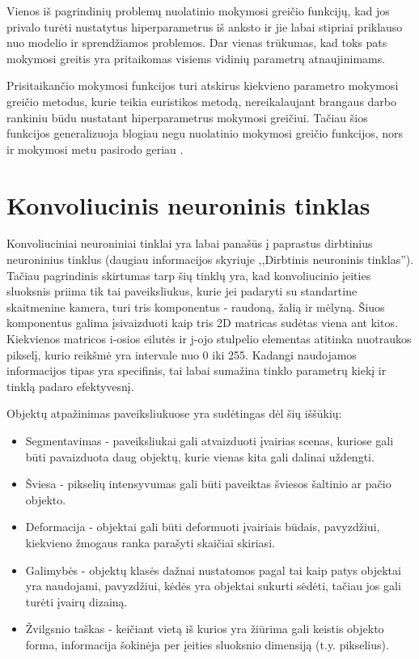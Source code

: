 \documentclass{VUMIFPSkursinis}
\begin{document}
Vienos iš pagrindinių problemų nuolatinio mokymosi greičio funkcijų, kad jos privalo turėti nustatytus hiperparametrus 
iš anksto ir jie labai stipriai priklauso nuo modelio ir sprendžiamos problemos. Dar vienas trūkumas, kad toks pats 
mokymosi greitis yra pritaikomas visiems vidinių parametrų atnaujinimams.

Prisitaikančio mokymosi funkcijos turi atskirus kiekvieno parametro mokymosi greičio metodus, kurie teikia euristikos 
metodą, nereikalaujant brangaus darbo rankiniu būdu nustatant hiperparametrus mokymosi greičiui. Tačiau šios funkcijos 
generalizuoja blogiau negu nuolatinio mokymosi greičio funkcijos, nors ir mokymosi metu pasirodo geriau \cite{2017arXiv170508292W}.


\section{Konvoliucinis neuroninis tinklas}
Konvoliuciniai neuroniniai tinklai yra labai panašūs į paprastus dirbtinius neuroninius tinklus (daugiau informacijos skyriuje ,,Dirbtinis neuroninis
tinklas''). Tačiau pagrindinis skirtumas tarp šių tinklų yra, kad konvoliucinio įeities sluoksnis priima tik tai paveiksliukus, 
kurie jei padaryti su standartine skaitmenine kamera, turi tris komponentus - raudoną, žalią ir mėlyną. Šiuos komponentus galima 
įsivaizduoti kaip tris 2D matricas sudėtas viena ant kitos. Kiekvienos matricos i-osios eilutės ir j-ojo stulpelio elementas 
atitinka nuotraukos pikselį, kurio reikšmė yra intervale nuo 0 iki 255. Kadangi naudojamos informacijos tipas yra specifinis, 
tai labai sumažina tinklo parametrų kiekį ir tinklą padaro efektyvesnį.


Objektų atpažinimas paveiksliukuose yra sudėtingas dėl šių iššūkių:
\begin{itemize}
\item Segmentavimas - paveiksliukai gali atvaizduoti įvairias scenas, kuriose gali būti pavaizduota daug objektų, kurie vienas kita gali dalinai uždengti.
\item Šviesa - pikselių intensyvumas gali būti paveiktas šviesos šaltinio ar pačio objekto.
\item Deformacija - objektai gali būti deformuoti įvairiais būdais, pavyzdžiui, kiekvieno žmogaus ranka parašyti skaičiai skiriasi.
\item Galimybės - objektų klasės dažnai nustatomos pagal tai kaip patys objektai yra naudojami, pavyzdžiui, kėdės yra objektai sukurti sėdėti, tačiau jos gali turėti įvairų dizainą.
\item Žvilgsnio taškas - keičiant vietą iš kurios yra žiūrima gali keistis objekto forma, informacija šokinėja per įeities sluoksnio dimensiją (t.y. pikselius). 
\end{itemize}
\end{document}
